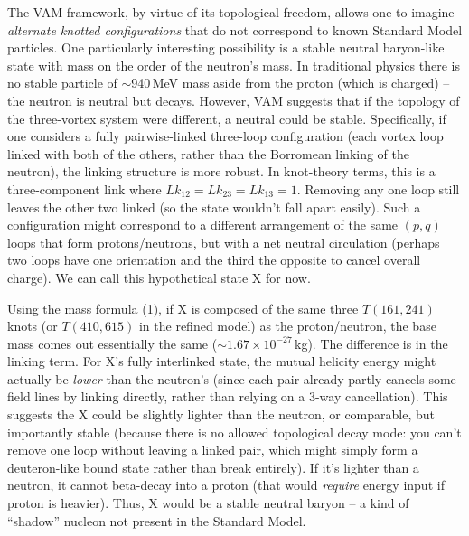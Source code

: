 \documentclass[a4paper,12pt]{article}
\begin{document}
        The VAM framework, by virtue of its topological freedom, allows one to imagine \textit{alternate knotted configurations} that do not correspond to known Standard Model particles. One particularly interesting possibility is a stable neutral baryon-like state with mass on the order of the neutron's mass. In traditional physics there is no stable particle of $\sim$940\,MeV mass aside from the proton (which is charged) -- the neutron is neutral but decays. However, VAM suggests that if the topology of the three-vortex system were different, a neutral could be stable. Specifically, if one considers a fully pairwise-linked three-loop configuration (each vortex loop linked with both of the others, rather than the Borromean linking of the neutron), the linking structure is more robust. In knot-theory terms, this is a three-component link where $Lk_{12}=Lk_{23}=Lk_{13}=1$. Removing any one loop still leaves the other two linked (so the state wouldn't fall apart easily). Such a configuration might correspond to a different arrangement of the same $(p,q)$ loops that form protons/neutrons, but with a net neutral circulation (perhaps two loops have one orientation and the third the opposite to cancel overall charge). We can call this hypothetical state X for now.
        
        Using the mass formula (1), if X is composed of the same three $T(161,241)$ knots (or $T(410,615)$ in the refined model) as the proton/neutron, the base mass comes out essentially the same ($\sim$$1.67\times10^{-27}$\,kg). The difference is in the linking term. For X's fully interlinked state, the mutual helicity energy might actually be \textit{lower} than the neutron's (since each pair already partly cancels some field lines by linking directly, rather than relying on a 3-way cancellation). This suggests the X could be slightly lighter than the neutron, or comparable, but importantly stable (because there is no allowed topological decay mode: you can't remove one loop without leaving a linked pair, which might simply form a deuteron-like bound state rather than break entirely). If it's lighter than a neutron, it cannot beta-decay into a proton (that would \textit{require} energy input if proton is heavier). Thus, X would be a stable neutral baryon -- a kind of ``shadow'' nucleon not present in the Standard Model.
        
\end{document}
